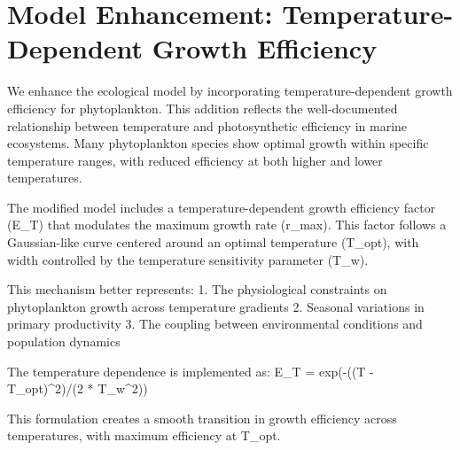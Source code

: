 \section{Model Enhancement: Temperature-Dependent Growth Efficiency}

We enhance the ecological model by incorporating temperature-dependent growth efficiency for phytoplankton. This addition reflects the well-documented relationship between temperature and photosynthetic efficiency in marine ecosystems. Many phytoplankton species show optimal growth within specific temperature ranges, with reduced efficiency at both higher and lower temperatures.

The modified model includes a temperature-dependent growth efficiency factor (E_T) that modulates the maximum growth rate (r_max). This factor follows a Gaussian-like curve centered around an optimal temperature (T_opt), with width controlled by the temperature sensitivity parameter (T_w).

This mechanism better represents:
1. The physiological constraints on phytoplankton growth across temperature gradients
2. Seasonal variations in primary productivity
3. The coupling between environmental conditions and population dynamics

The temperature dependence is implemented as:
E_T = exp(-((T - T_opt)^2)/(2 * T_w^2))

This formulation creates a smooth transition in growth efficiency across temperatures, with maximum efficiency at T_opt.
